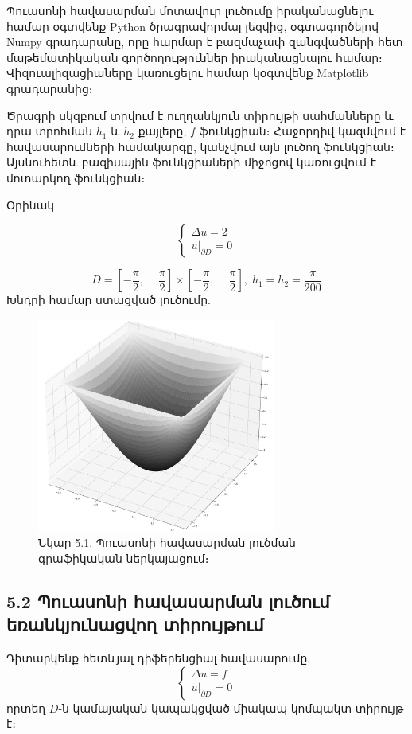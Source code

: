 \documentclass[fleqn, bachelor,subf,12pt,notitlepage]{article}
\begin{document}
Պուասոնի հավասարման մոտավուր լուծումը իրականացնելու համար օգտվենք Python ծրագրավորմալ լեզվից, օգտագործելով Numpy գրադարանը, որը հարմար է բազմաչափ զանգվածների հետ մաթեմատիկական գործողություններ իրականացնալու համար։ Վիզուալիզացիաները կառուցելու համար կօգտվենք Matplotlib գրադարանից։

Ծրագրի սկզբում տրվում է ուղղանկյուն տիրույթի սահմանները և դրա տրոհման $h_{1}$ և $h_{2}$ քայլերը, $f$ ֆունկցիան։ Հաջորդիվ կազմվում է հավասարումների համակարգը, կանչվում այն լուծող ֆունկցիան։ Այսնուհետև բազիսային ֆունկցիաների միջոցով կառուցվում է մոտարկող ֆունկցիան։

Օրինակ


				$$
					\begin{cases}
								\Delta u =2 \\
								u \Big |_{\partial D} = 0
					\end{cases}
				$$

				$$ D = \left[-\dfrac{\pi}{2}, \phantom{-}\dfrac{\pi}{2}\right] \times \left[-\dfrac{\pi}{2}, \phantom{-}\dfrac{\pi}{2}\right], \; h_{1}=h_{2}=\dfrac{\pi}{200}$$
Խնդրի համար ստացված լուծումը.
\begin{figure}[H]
\centering
\includegraphics[width=0.7\textwidth]{images/poisson_solution}
\captionsetup{labelformat=empty}
\caption{Նկար 5.1. Պուասոնի հավասարման լուծման գրաֆիկական ներկայացում։}
\end{figure}
\newpage
\subsection*{{5.2 Պուասոնի հավասարման լուծում եռանկյունացվող տիրույթում}}

Դիտարկենք հետևյալ դիֆերենցիալ հավասարումը.
\begin{equation}
\begin{cases}
			\Delta u =f \\
			u \Big |_{\partial D} = 0
\end{cases}
\end{equation}
որտեղ $D$-ն կամայական կապակցված միակապ կոմպակտ տիրույթ է։
\end{document}
